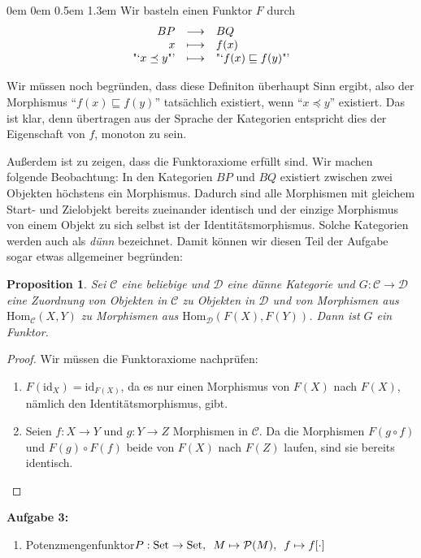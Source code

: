 \documentclass[a4paper,ngerman]{scrartcl}
\theoremstyle{definition}
\theoremstyle{plain}
\newtheorem{prop}[defn]{Proposition}
\theoremstyle{remark}
\newcommand{\C}{\mathcal{C}}
\newcommand{\Hom}{\mathrm{Hom}}
\newcommand{\Set}{\mathrm{Set}}
\newcommand{\id}{\mathrm{id}}
\newcommand{\D}{\mathcal{D}}
\begin{document}
\begin{list}{}{0em \leftmargin0em \itemindent0.5em \itemsep 1.3em}
Wir basteln einen Funktor $F$ durch
\[ \begin{array}{@{}rcl@{}}
  BP &\longrightarrow& BQ\\
  x  &\longmapsto& f(x)\\
  \text{"`$x \preceq y$"'} &\longmapsto& \text{"`$f(x) \sqsubseteq f(y)$"'}
\end{array} \]

Wir müssen noch begründen, dass diese Definiton überhaupt Sinn ergibt, also der Morphismus "`$f(x) \sqsubseteq f(y)$"' tatsächlich existiert, wenn "`$x \preceq y$"' existiert. Das ist klar, denn übertragen aus der Sprache der Kategorien entspricht dies der Eigenschaft von $f$, monoton zu sein.

Außerdem ist zu zeigen, dass die Funktoraxiome erfüllt sind. Wir machen folgende Beobachtung: In den Kategorien $BP$ und $BQ$ existiert zwischen zwei Objekten höchstens ein Morphismus. Dadurch sind alle Morphismen mit gleichem Start- und Zielobjekt bereits zueinander identisch und der einzige Morphismus von einem Objekt zu sich selbst ist der Identitätsmorphismus. Solche Kategorien werden auch als \emph{dünn} bezeichnet. Damit können wir diesen Teil der Aufgabe sogar etwas allgemeiner begründen:\\


\begin{prop}
  Sei $\C$ eine beliebige und $\D$ eine dünne Kategorie und $G : \C \to \D$ eine Zuordnung von Objekten in $\C$ zu Objekten in $\D$ und von Morphismen aus $\Hom_\C(X, Y)$ zu Morphismen aus $\Hom_\D(F(X), F(Y))$. Dann ist $G$ ein Funktor.
\end{prop}

\begin{proof}
Wir müssen die Funktoraxiome nachprüfen:
\begin{enumerate}
\item $F(\id_X) = \id_{F(X)}$, da es nur einen Morphismus von $F(X)$ nach $F(X)$, nämlich den Identitätsmorphismus, gibt.
\item Seien $f : X \to Y$ und $g : Y \to Z$ Morphismen in $\C$. Da die Morphismen $F(g \circ f)$ und $F(g) \circ F(f)$ beide von $F(X)$ nach $F(Z)$ laufen, sind sie bereits identisch.\qedhere
\end{enumerate}
\end{proof}

\item[\textbf{Aufgabe 3:}]\mbox{}

\begin{enumerate}
\item Potenzmengenfunktor\enskip$P : \Set \to \Set, \enskip M \mapsto \mathcal{P}(M), \enskip f \mapsto f[\cdot]$


\end{enumerate}
\end{list}
\end{document}
